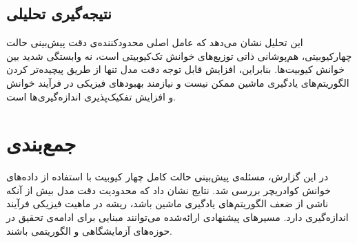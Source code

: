 \documentclass[12pt,a4paper]{article}
\begin{document}
\subsection{نتیجه‌گیری تحلیلی}
این تحلیل نشان می‌دهد که عامل اصلی محدودکننده‌ی دقت پیش‌بینی حالت چهارکیوبیتی، هم‌پوشانی ذاتی توزیع‌های خوانش تک‌کیوبیتی است، نه وابستگی شدید بین خوانش کیوبیت‌ها. بنابراین، افزایش قابل توجه دقت مدل تنها از طریق پیچیده‌تر کردن الگوریتم‌های یادگیری ماشین ممکن نیست و نیازمند بهبودهای فیزیکی در فرآیند خوانش و افزایش تفکیک‌پذیری اندازه‌گیری‌ها است.


\section{جمع‌بندی}
در این گزارش، مسئله‌ی پیش‌بینی حالت کامل چهار کیوبیت با استفاده از داده‌های خوانش کوادریچر بررسی شد. نتایج نشان داد که محدودیت دقت مدل بیش از آنکه ناشی از ضعف الگوریتم‌های یادگیری ماشین باشد، ریشه در ماهیت فیزیکی فرآیند اندازه‌گیری دارد. مسیرهای پیشنهادی ارائه‌شده می‌توانند مبنایی برای ادامه‌ی تحقیق در حوزه‌های آزمایشگاهی و الگوریتمی باشند.
\end{document}
